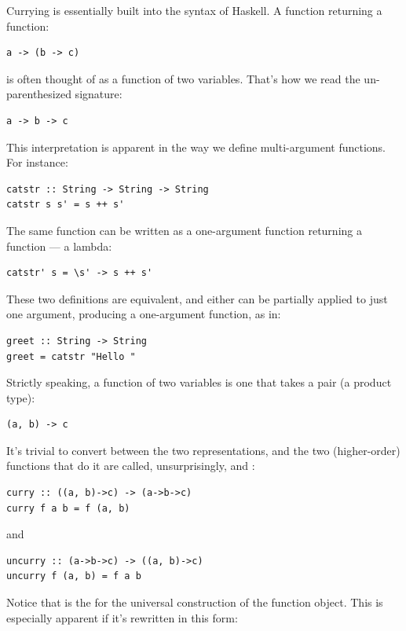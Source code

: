 Currying is essentially built into the syntax of Haskell. A function
returning a function:

\begin{Verbatim}[commandchars=\\\{\}]
a -> (b -> c)
\end{Verbatim}
is often thought of as a function of two variables. That's how we read
the un-parenthesized signature:

\begin{Verbatim}[commandchars=\\\{\}]
a -> b -> c
\end{Verbatim}
This interpretation is apparent in the way we define multi-argument
functions. For instance:

\begin{Verbatim}[commandchars=\\\{\}]
catstr :: String -> String -> String
catstr s s' = s ++ s'
\end{Verbatim}
The same function can be written as a one-argument function returning a
function --- a lambda:

\begin{Verbatim}
catstr' s = \s' -> s ++ s'
\end{Verbatim}
These two definitions are equivalent, and either can be partially
applied to just one argument, producing a one-argument function, as in:

\begin{Verbatim}[commandchars=\\\{\}]
greet :: String -> String
greet = catstr "Hello "
\end{Verbatim}
Strictly speaking, a function of two variables is one that takes a pair
(a product type):

\begin{Verbatim}[commandchars=\\\{\}]
(a, b) -> c
\end{Verbatim}
It's trivial to convert between the two representations, and the two
(higher-order) functions that do it are called, unsurprisingly,
 and :

\begin{Verbatim}[commandchars=\\\{\}]
curry :: ((a, b)->c) -> (a->b->c)
curry f a b = f (a, b)
\end{Verbatim}
and

\begin{Verbatim}[commandchars=\\\{\}]
uncurry :: (a->b->c) -> ((a, b)->c)
uncurry f (a, b) = f a b
\end{Verbatim}
Notice that  is the  for the universal
construction of the function object. This is especially apparent if it's
rewritten in this form:

